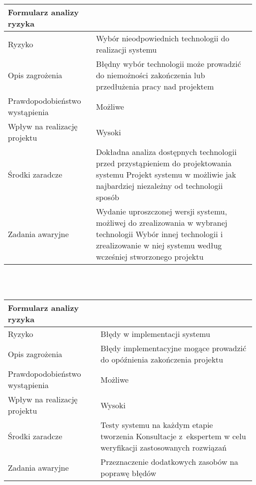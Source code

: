 \documentclass{article}
\begin{document}
\begin{tabular}{|L{6cm}|L{9cm}|}
\hline
Formularz analizy ryzyka &  \\
\hline
Ryzyko 						   & Wybór nieodpowiednich technologii do realizacji systemu \\
\hline
Opis zagrożenia				   & Błędny wybór technologii może prowadzić do niemożności zakończenia lub przedłużenia pracy nad projektem \\
\hline
Prawdopodobieństwo wystąpienia & Możliwe \\
\hline
Wpływ na realizację projektu   & Wysoki \\
\hline
Środki zaradcze				   & Dokładna analiza dostępnych technologii przed przystąpieniem do projektowania systemu
Projekt systemu w możliwie jak najbardziej niezależny od technologii sposób
 \\
\hline
Zadania awaryjne			   & Wydanie uproszczonej wersji systemu, możliwej do zrealizowania w wybranej technologii
Wybór innej technologii i zrealizowanie w niej systemu według wcześniej stworzonego projektu
 \\
\hline
\end{tabular}

\mbox{}\\\mbox{}\\

\begin{tabular}{|L{6cm}|L{9cm}|}
\hline
Formularz analizy ryzyka &  \\
\hline
Ryzyko 						   & Błędy w implementacji systemu \\
\hline
Opis zagrożenia				   & Błędy implementacyjne mogące prowadzić do opóźnienia zakończenia projektu \\
\hline
Prawdopodobieństwo wystąpienia & Możliwe \\
\hline
Wpływ na realizację projektu   & Wysoki \\
\hline
Środki zaradcze				   & Testy systemu na każdym etapie tworzenia
Konsultacje z~ekspertem w celu weryfikacji zastosowanych rozwiązań
 \\
\hline
Zadania awaryjne			   & Przeznaczenie dodatkowych zasobów na poprawę błędów \\
\hline
\end{tabular}
\end{document}
